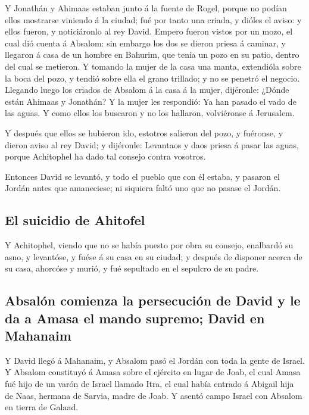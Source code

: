  Y Jonathán y Ahimaas estaban junto á la fuente de Rogel,
porque no podían ellos mostrarse viniendo á la ciudad; fué por tanto una
criada, y dióles el aviso: y ellos fueron, y noticiáronlo al rey David.
 Empero fueron vistos por un mozo, el cual dió cuenta á
Absalom: sin embargo los dos se dieron priesa á caminar, y llegaron á
casa de un hombre en Bahurim, que tenía un pozo en su patio, dentro del
cual se metieron.  Y tomando la mujer de la casa una
manta, extendióla sobre la boca del pozo, y tendió sobre ella el grano
trillado; y no se penetró el negocio.  Llegando luego los
criados de Absalom á la casa á la mujer, dijéronle: ¿Dónde están Ahimaas
y Jonathán? Y la mujer les respondió: Ya han pasado el vado de las
aguas. Y como ellos los buscaron y no los hallaron, volviéronse á
Jerusalem.

 Y después que ellos se hubieron ido, estotros salieron
del pozo, y fuéronse, y dieron aviso al rey David; y dijéronle:
Levantaos y daos priesa á pasar las aguas, porque Achitophel ha dado tal
consejo contra vosotros.

 Entonces David se levantó, y todo el pueblo que con él
estaba, y pasaron el Jordán antes que amaneciese; ni siquiera faltó uno
que no pasase el Jordán.

\hypertarget{el-suicidio-de-ahitofel}{%
\subsection{El suicidio de Ahitofel}\label{el-suicidio-de-ahitofel}}

 Y Achitophel, viendo que no se había puesto por obra su
consejo, enalbardó su asno, y levantóse, y fuése á su casa en su ciudad;
y después de disponer acerca de su casa, ahorcóse y murió, y fué
sepultado en el sepulcro de su padre.

\hypertarget{absaluxf3n-comienza-la-persecuciuxf3n-de-david-y-le-da-a-amasa-el-mando-supremo-david-en-mahanaim}{%
\subsection{Absalón comienza la persecución de David y le da a Amasa el
mando supremo; David en
Mahanaim}\label{absaluxf3n-comienza-la-persecuciuxf3n-de-david-y-le-da-a-amasa-el-mando-supremo-david-en-mahanaim}}

 Y David llegó á Mahanaim, y Absalom pasó el Jordán con
toda la gente de Israel.  Y Absalom constituyó á Amasa
sobre el ejército en lugar de Joab, el cual Amasa fué hijo de un varón
de Israel llamado Itra, el cual había entrado á Abigail hija de Naas,
hermana de Sarvia, madre de Joab.  Y asentó campo Israel
con Absalom en tierra de Galaad.

